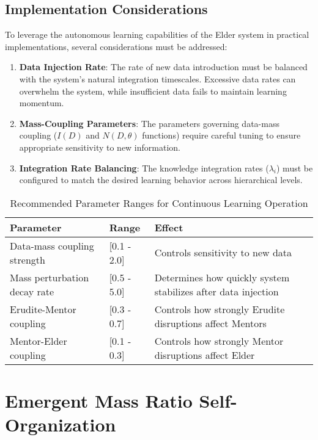 \subsection{Implementation Considerations}

To leverage the autonomous learning capabilities of the Elder system in practical implementations, several considerations must be addressed:

\begin{enumerate}
    \item \textbf{Data Injection Rate}: The rate of new data introduction must be balanced with the system's natural integration timescales. Excessive data rates can overwhelm the system, while insufficient data fails to maintain learning momentum.
    
    \item \textbf{Mass-Coupling Parameters}: The parameters governing data-mass coupling ($I(D)$ and $N(D, \theta)$ functions) require careful tuning to ensure appropriate sensitivity to new information.
    
    \item \textbf{Integration Rate Balancing}: The knowledge integration rates ($\lambda_i$) must be configured to match the desired learning behavior across hierarchical levels.
\end{enumerate}

\begin{table}[h]
\centering
\caption{Recommended Parameter Ranges for Continuous Learning Operation}
\label{tab:parameter_ranges}
\begin{tabular}{p{4cm} p{3cm} p{7cm}}
\textbf{Parameter} & \textbf{Range} & \textbf{Effect} \\
\hline
Data-mass coupling strength & [0.1 - 2.0] & Controls sensitivity to new data \\
Mass perturbation decay rate & [0.5 - 5.0] & Determines how quickly system stabilizes after data injection \\
Erudite-Mentor coupling & [0.3 - 0.7] & Controls how strongly Erudite disruptions affect Mentors \\
Mentor-Elder coupling & [0.1 - 0.3] & Controls how strongly Mentor disruptions affect Elder \\
\hline
\end{tabular}
\end{table}

\section{Emergent Mass Ratio Self-Organization}

